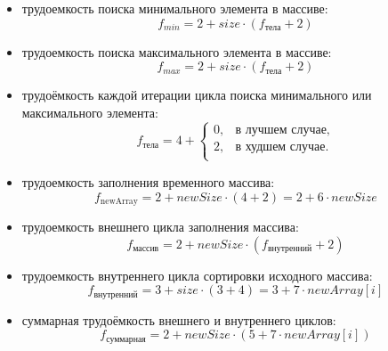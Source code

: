\begin{itemize}
	\item трудоемкость поиска минимального элемента в массиве:
	\begin{equation}
		\label{min}
		f_{min} =  2 + size \cdot (f_{\text{тела}} + 2)
	\end{equation}

	\item трудоемкость поиска максимального элемента в массиве:
	\begin{equation}
		\label{max}
		f_{max} =  2 + size \cdot (f_{\text{тела}} + 2)
	\end{equation}
			
	\item трудоёмкость каждой итерации цикла поиска минимального или максимального элемента:
	\begin{equation}
	\label{min_max_if}
	f_{\text{тела}} = 4 + \begin{cases}
		0, & \text{в лучшем случае},\\
		2, & \text{в худшем случае}.\\
	\end{cases}
	\end{equation}

	\item трудоемкость заполнения временного массива:
	\begin{equation}
		\label{newArray}
		f_{\text{newArray}} = 2 + newSize \cdot (4 + 2) = 2 + 6 \cdot newSize
	\end{equation}

	\item трудоемкость внешнего цикла заполнения массива:
	\begin{equation}
		\label{array}
		f_{\text{массив}} = 2 + newSize \cdot (f_{\text{внутренний}} + 2) 
	\end{equation}

	\item трудоемкость внутреннего цикла сортировки исходного массива:
	\begin{equation}
		\label{innerArray}
		f_{\text{внутренний}} = 3 + size \cdot (3 + 4)  = 3 + 7 \cdot  newArray[i]
	\end{equation}
	
	\item суммарная трудоёмкость внешнего и внутреннего циклов:
	\begin{equation}
		\label{array}
		f_{\text{суммарная}} = 2 + newSize \cdot (5 + 7 \cdot newArray[i]) 
	\end{equation}
\end{itemize}

